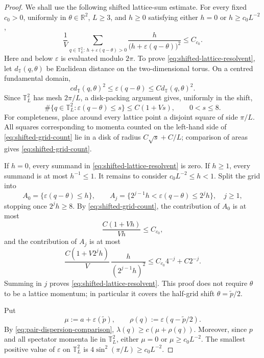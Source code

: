 \documentclass[11pt]{article}
\numberwithin{equation}{section}
\theoremstyle{remark}
\newcommand{\1}{\mathbf 1}
\begin{document}
\begin{proof}
We shall use the following shifted lattice-sum estimate.  For every fixed
\(c_0>0\), uniformly in \(\theta\in\mathbb R^2\), \(L\geq3\), and
\(h\geq0\) satisfying either \(h=0\) or \(h\geq c_0L^{-2}\),
\begin{equation}
 \frac1V\sum_{q\in\mathbb T_L^2:\,h+\varepsilon(q-\theta)>0}
 \frac{h}{\bigl(h+\varepsilon(q-\theta)\bigr)^2}
 \leq C_{c_0}.
 \label{eq:shifted-lattice-resolvent}
\end{equation}
Here and below \(\varepsilon\) is evaluated modulo \(2\pi\).  To prove
\eqref{eq:shifted-lattice-resolvent}, let
\(d_{\mathbb T}(q,\theta)\) be Euclidean distance on the two-dimensional
torus.  On a centred fundamental domain,
\[
 c d_{\mathbb T}(q,\theta)^2
 \leq\varepsilon(q-\theta)
 \leq C d_{\mathbb T}(q,\theta)^2.
\]
Since \(\mathbb T_L^2\) has mesh \(2\pi/L\), a disk-packing argument gives,
uniformly in the shift,
\begin{equation}
 \#\{q\in\mathbb T_L^2:\varepsilon(q-\theta)\leq s\}
 \leq C(1+Vs),\qquad 0<s\leq8.
 \label{eq:shifted-grid-count}
\end{equation}
For completeness, place around every lattice point a disjoint square of
side \(\pi/L\).  All squares corresponding to momenta counted on the
left-hand side of \eqref{eq:shifted-grid-count} lie in a disk of radius
\(C\sqrt{s}+C/L\); comparison of areas gives
\eqref{eq:shifted-grid-count}.

If \(h=0\), every summand in \eqref{eq:shifted-lattice-resolvent} is zero.
If \(h\geq1\), every summand is at most \(h^{-1}\leq1\).  It remains to
consider \(c_0L^{-2}\leq h<1\).  Split the grid into
\[
 A_0=\{\varepsilon(q-\theta)\leq h\},\qquad
 A_j=\{2^{j-1}h<\varepsilon(q-\theta)\leq2^jh\},\quad j\geq1,
\]
stopping once \(2^jh\geq8\).  By \eqref{eq:shifted-grid-count}, the
contribution of \(A_0\) is at most
\[
 \frac{C(1+Vh)}{Vh}\leq C_{c_0},
\]
and the contribution of \(A_j\) is at most
\[
 \frac{C(1+V2^jh)}{V}\,
 \frac{h}{(2^{j-1}h)^2}
 \leq C_{c_0}4^{-j}+C2^{-j}.
\]
Summing in \(j\) proves \eqref{eq:shifted-lattice-resolvent}.  This proof
does not require \(\theta\) to be a lattice momentum; in particular it
covers the half-grid shift \(\theta=\widetilde p/2\).

Put
\[
 \mu:=a+\varepsilon(\widetilde p),\qquad
 \rho(q):=\varepsilon(q-\widetilde p/2).
\]
By \eqref{eq:pair-dispersion-comparison},
\(\lambda(q)\geq c(\mu+\rho(q))\).  Moreover, since \(p\) and all
spectator momenta lie in \(\mathbb T_L^2\), either \(\mu=0\) or
\(\mu\geq c_0L^{-2}\).  The smallest positive value of
\(\varepsilon\) on \(\mathbb T_L^2\) is
\(4\sin^2(\pi/L)\geq c_0L^{-2}\).


\end{proof}
\end{document}
